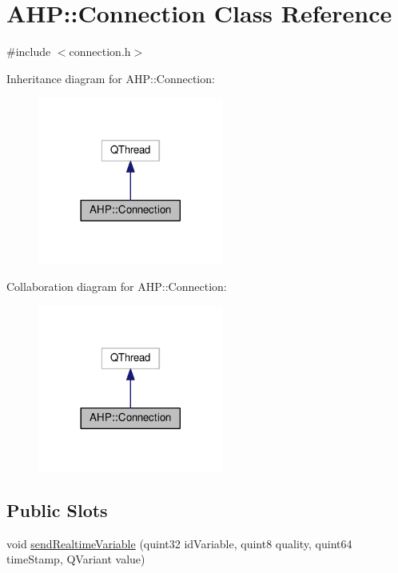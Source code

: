 \hypertarget{class_a_h_p_1_1_connection}{}\section{A\+H\+P\+:\+:Connection Class Reference}
\label{class_a_h_p_1_1_connection}


{\ttfamily \#include $<$connection.\+h$>$}



Inheritance diagram for A\+H\+P\+:\+:Connection\+:
\nopagebreak
\begin{figure}[H]
\begin{center}
\leavevmode
\includegraphics[width=173pt]{class_a_h_p_1_1_connection__inherit__graph}
\end{center}
\end{figure}


Collaboration diagram for A\+H\+P\+:\+:Connection\+:
\nopagebreak
\begin{figure}[H]
\begin{center}
\leavevmode
\includegraphics[width=173pt]{class_a_h_p_1_1_connection__coll__graph}
\end{center}
\end{figure}
\subsection*{Public Slots}
\begin{DoxyCompactItemize}
\item 
void \hyperlink{class_a_h_p_1_1_connection_ad1e97b6e525beca9d9ae05a67d8c5df4}{send\+Realtime\+Variable} (quint32 id\+Variable, quint8 quality, quint64 time\+Stamp, Q\+Variant value)
\end{DoxyCompactItemize}
